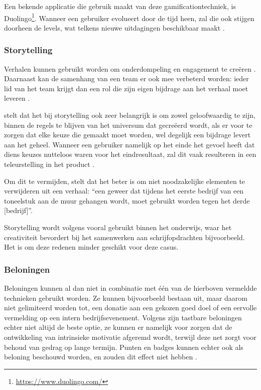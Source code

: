 Een bekende applicatie die gebruik maakt van deze gamificationtechniek, is Duolingo\footnote{\href{https://www.duolingo.com/}{https://www.duolingo.com/}}. Wanneer een gebruiker evolueert door de tijd heen, zal die ook stijgen doorheen de levels, wat telkens nieuwe uitdagingen beschikbaar maakt \autocite{Shortt2021}.

\subsubsection{Storytelling}
Verhalen kunnen gebruikt worden om onderdompeling en engagement te creëren \autocite{ManzanoLeon2021}. Daarnaast kan de samenhang van een team er ook mee verbeterd worden: ieder lid van het team krijgt dan een rol die zijn eigen bijdrage aan het verhaal moet leveren \autocite{ManzanoLeon2021}.

\textcite{Marczewski2015} stelt dat het bij storytelling ook zeer belangrijk is om zowel geloofwaardig te zijn, binnen de regels te blijven van het universum dat gecreëerd wordt, als er voor te zorgen dat elke keuze die gemaakt moet worden, wel degelijk een bijdrage levert aan het geheel. Wanneer een gebruiker namelijk op het einde het gevoel heeft dat diens keuzes nutteloos waren voor het eindresultaat, zal dit vaak resulteren in een teleurstelling in het product \autocite{Marczewski2015}.

Om dit te vermijden, stelt \textcite{Duster1990} dat het beter is om niet noodzakelijke elementen te verwijderen uit een verhaal: ``een geweer dat tijdens het eerste bedrijf van een toneelstuk aan de muur gehangen wordt, moet gebruikt worden tegen het derde [bedrijf]''.

Storytelling wordt volgens \textcite{Schmoelz2018} vooral gebruikt binnen het onderwijs, waar het creativiteit bevordert bij het samenwerken aan schrijfopdrachten bijvoorbeeld. Het is om deze redenen minder geschikt voor deze casus.

\subsubsection{Beloningen}
Beloningen kunnen al dan niet in combinatie met één van de hierboven vermeldde technieken gebruikt worden. Ze kunnen bijvoorbeeld bestaan uit, maar daarom niet gelimiteerd worden tot, een donatie aan een gekozen goed doel of een eervolle vermelding op een intern bedrijfsevenement.
Volgens \textcite{Lewis2016} zijn tastbare beloningen echter niet altijd de beste optie, ze kunnen er namelijk voor zorgen dat de ontwikkeling van intrinsieke motivatie afgeremd wordt, terwijl deze net zorgt voor behoud van gedrag op lange termijn. Punten en badges kunnen echter ook als beloning beschouwd worden, en zouden dit effect niet hebben \autocite{Lewis2016}.

